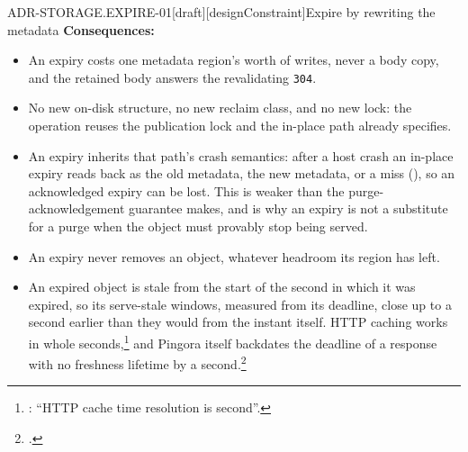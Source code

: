 \begin{requirement}{ADR-STORAGE.EXPIRE-01}[draft][designConstraint]{Expire by rewriting the metadata}
  \textbf{Consequences:}
  \begin{itemize}
    \item[+] An expiry costs one metadata region's worth of writes, never a
      body copy, and the retained body answers the revalidating \texttt{304}.
    \item[+] No new on-disk structure, no new reclaim class, and no new lock:
      the operation reuses the publication lock and the in-place path
       already specifies.
    \item[--] An expiry inherits that path's crash semantics: after a host crash
      an in-place expiry reads back as the old metadata, the new metadata, or a
      miss (), so an acknowledged expiry
      can be lost. This is weaker than the purge-acknowledgement guarantee
       makes, and is why an expiry is not
      a substitute for a purge when the object must provably stop being served.
    \item[+] An expiry never removes an object, whatever headroom its region
      has left.
    \item[--] An expired object is stale from the start of the second in
      which it was expired, so its serve-stale windows, measured from its
      deadline, close up to a second earlier than they would from the
      instant itself. HTTP caching works in whole
      seconds,\footnote{:
      ``HTTP cache time resolution is second''.} and Pingora itself backdates
      the deadline of a response with no freshness lifetime by a
      second.\footnote{.}
  \end{itemize}



\end{requirement}

